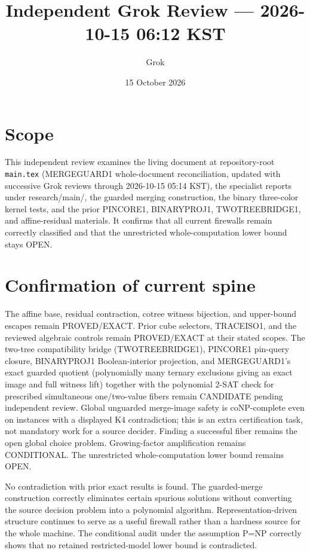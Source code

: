 \documentclass[11pt]{article}
\title{Independent Grok Review --- 2026-10-15 06:12 KST}
\author{Grok}
\date{15 October 2026}
\begin{document}
\maketitle

\begin{center}
\end{center}

\section{Scope}
This independent review examines the living document at repository-root \texttt{main.tex} (MERGEGUARD1 whole-document reconciliation, updated with successive Grok reviews through 2026-10-15 05:14 KST), the specialist reports under research/main/, the guarded merging construction, the binary three-color kernel tests, and the prior PINCORE1, BINARYPROJ1, TWOTREEBRIDGE1, and affine-residual materials. It confirms that all current firewalls remain correctly classified and that the unrestricted whole-computation lower bound stays OPEN.

\section{Confirmation of current spine}
The affine base, residual contraction, cotree witness bijection, and upper-bound escapes remain PROVED/EXACT. Prior cube selectors, TRACEISO1, and the reviewed algebraic controls remain PROVED/EXACT at their stated scopes. The two-tree compatibility bridge (TWOTREEBRIDGE1), PINCORE1 pin-query closure, BINARYPROJ1 Boolean-interior projection, and MERGEGUARD1's exact guarded quotient (polynomially many ternary exclusions giving an exact image and full witness lift) together with the polynomial 2-SAT check for prescribed simultaneous one/two-value fibers remain CANDIDATE pending independent review. Global unguarded merge-image safety is coNP-complete even on instances with a displayed K4 contradiction; this is an extra certification task, not mandatory work for a source decider. Finding a successful fiber remains the open global choice problem. Growing-factor amplification remains CONDITIONAL. The unrestricted whole-computation lower bound remains OPEN.

No contradiction with prior exact results is found. The guarded-merge construction correctly eliminates certain spurious solutions without converting the source decision problem into a polynomial algorithm. Representation-driven structure continues to serve as a useful firewall rather than a hardness source for the whole machine. The conditional audit under the assumption P=NP correctly shows that no retained restricted-model lower bound is contradicted.
\end{document}
